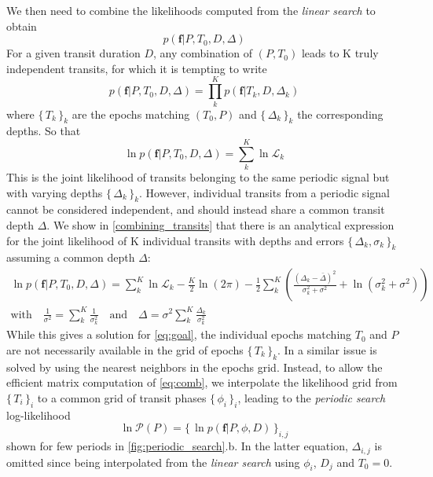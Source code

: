 \documentclass{aastex631}
\newcommand{\set}[1]{\{\,#1\,\}}
\begin{document}
We then need to combine the likelihoods computed from the \textit{linear search} to obtain
\begin{equation}\label{eq:goal}
    p(\bm{f} \vert P, T_0 , D, \Delta)
\end{equation}
For a given transit duration $D$, any combination of $(P, T_0)$ leads to K truly independent transits, for which it is tempting to write
\begin{equation}\label{eq:attempt}
    p(\bm{f} \vert P, T_0 ,D, \Delta) = \prod_k^K p(\bm{f} \vert T_k, D, \Delta_k)
\end{equation}
where $\set{T_k}_k$ are the epochs matching $(T_0, P)$ and $\set{\Delta_k}_k$ the corresponding depths. So that
$$
    \ln p(\bm{f} \vert P, T_0 ,D, \Delta) = \sum_k^K \ln \mathcal{L}_k
$$
This is the joint likelihood of transits belonging to the same periodic signal but with varying depths  $\set{\Delta_k}_k$. However, individual transits from a periodic signal cannot be considered independent, and should instead share a common transit depth $\Delta$. We show in \autoref{combining_transits} that there is an analytical expression for the joint likelihood of K individual transits with depths and errors $\set{\Delta_k, \sigma_k}_k$ assuming a common depth $\Delta$:
\begin{equation}\label{eq:comb}
    \begin{gathered}
        \ln p(\bm{f} \vert P, T_0 ,D, \Delta) =  \sum_{k}^K \ln \mathcal{L}_k  - \frac{K}{2}\ln(2\pi) - \frac{1}{2}\sum_k^K \left( \frac{\left(\Delta_{k} -
        \bar\Delta\right)^{2}}{\sigma_k^{2} + \sigma^{2}} + \ln{\left(\sigma_k^{2} + \sigma^{2} \right)} \right) \\
        \text{with} \quad  \frac{1}{\sigma^2} = \sum_k^K \frac{1}{\sigma_k^2} \quad \text{and} \quad
        \Delta = \sigma^2 \sum_k^K {\frac{\Delta_k}{\sigma_k^2}}
    \end{gathered}
\end{equation}
While this gives a solution for \autoref{eq:goal}, the individual epochs matching $T_0$ and $P$ are not necessarily available in the grid of epochs $\set{T_k}_k$. In \cite{foreman2016} a similar issue is solved by using the nearest neighbors in the epochs grid. Instead, to allow the efficient matrix computation of \autoref{eq:comb}, we interpolate the likelihood grid from $\set{T_i}_i$ to a common grid of transit phases $\set{\phi_i}_i$, leading to the \textit{periodic search} log-likelihood
$$\ln\mathcal{P}(P) = \set{\ln p(\bm{f} \vert P, \phi, D)}_{i,j}$$
shown for few periods in \autoref{fig:periodic_search}.b. In the latter equation, $\Delta_{i,j}$ is omitted since being interpolated from the \textit{linear search} using $\phi_i$, $D_j$ and $T_0 = 0$.
\end{document}
